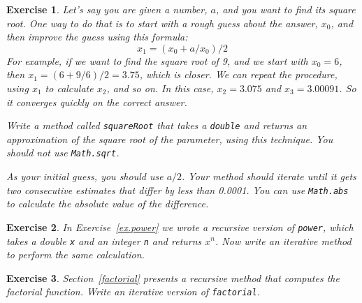 \documentclass[12pt]{book}
\theoremstyle{exercise}
\newtheorem{exercise}{Exercise}[chapter]
\newcommand{\java}[1]{\verb"#1"}
\newcommand{\java}[1]{\lstinline{#1}} %
\begin{document}
\begin{exercise}

Let's say you are given a number, $a$, and you want to find its square root.
One way to do that is to start with a rough guess about the answer, $x_0$, and then improve the guess using this formula:
%
\[ x_1 =(x_0 + a/x_0) / 2 \]
%
For example, if we want to find the square root of 9, and we start with $x_0 = 6$, then $x_1 = (6 + 9/6) / 2 = 3.75$, which is closer.
We can repeat the procedure, using $x_1$ to calculate $x_2$, and so on.
In this case, $x_2 = 3.075$ and $x_3 = 3.00091$.
So it converges quickly on the correct answer.

Write a method called \java{squareRoot} that takes a \java{double} and returns an approximation of the square root of the parameter, using this technique.
You should not use \java{Math.sqrt}.

As your initial guess, you should use $a/2$.
Your method should iterate until it gets two consecutive estimates that differ by less than 0.0001.
You can use \java{Math.abs} to calculate the absolute value of the difference.

\end{exercise}


\begin{exercise}

In Exercise~\ref{ex.power} we wrote a recursive version of \java{power}, which takes a double \java{x} and an integer \java{n} and returns $x^n$.
Now write an iterative method to perform the same calculation.

\end{exercise}


\begin{exercise}

Section~\ref{factorial} presents a recursive method that computes the factorial function.
Write an iterative version of \java{factorial}.

\end{exercise}
\end{document}
